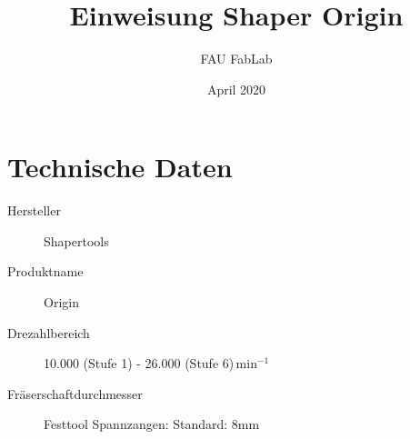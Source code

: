 \documentclass{\basedir/fablab-document}
\date{April 2020}
\author{FAU FabLab}
\title{Einweisung Shaper Origin}
\begin{document}
\dosecttoc
\faketableofcontents
{}




\section{Technische Daten}
\begin{description}
    \item[Hersteller] Shapertools
    \item[Produktname] Origin
    \item[Drezahlbereich] 10.000 (Stufe 1) - 26.000 (Stufe 6)$\,\mathrm{min}^{-1}$
    \item[Fräserschaftdurchmesser] Festtool Spannzangen: Standard: 8mm
\end{description}
\end{document}
